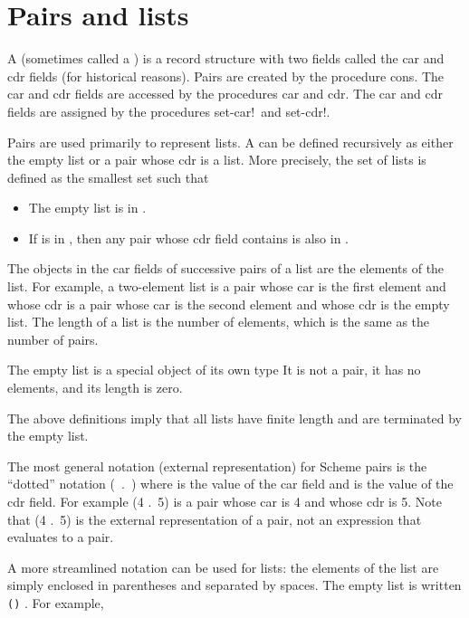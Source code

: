 \section{Pairs and lists}
\label{listsection}

A  (sometimes called a ) is a
record structure with two fields called the car and cdr fields (for
historical reasons).  Pairs are created by the procedure {\cf cons}.
The car and cdr fields are accessed by the procedures {\cf car} and
{\cf cdr}.  The car and cdr fields are assigned by the procedures
{\cf set-car!}\ and {\cf set-cdr!}.

Pairs are used primarily to represent lists.  A  can
be defined recursively as either the empty list or a pair whose
cdr is a list.  More precisely, the set of lists is defined as the smallest
set  such that

\begin{itemize}
\item The empty list is in .
\item If  is in , then any pair whose cdr field contains
       is also in .
\end{itemize}

The objects in the car fields of successive pairs of a list are the
elements of the list.  For example, a two-element list is a pair whose car
is the first element and whose cdr is a pair whose car is the second element
and whose cdr is the empty list.  The length of a list is the number of
elements, which is the same as the number of pairs.

The empty list is a special object of its own type
It is not a pair, it has no elements, and its length is zero.

\begin{note}
The above definitions imply that all lists have finite length and are
terminated by the empty list.
\end{note}

The most general notation (external representation) for Scheme pairs is
the ``dotted'' notation \hbox{\cf ( .\ )} where
 is the value of the car field and  is the value of the
cdr field.  For example {\cf (4 .\ 5)} is a pair whose car is 4 and whose
cdr is 5.  Note that {\cf (4 .\ 5)} is the external representation of a
pair, not an expression that evaluates to a pair.

A more streamlined notation can be used for lists: the elements of the
list are simply enclosed in parentheses and separated by spaces.  The
empty list is written {\tt()} .  For example,

